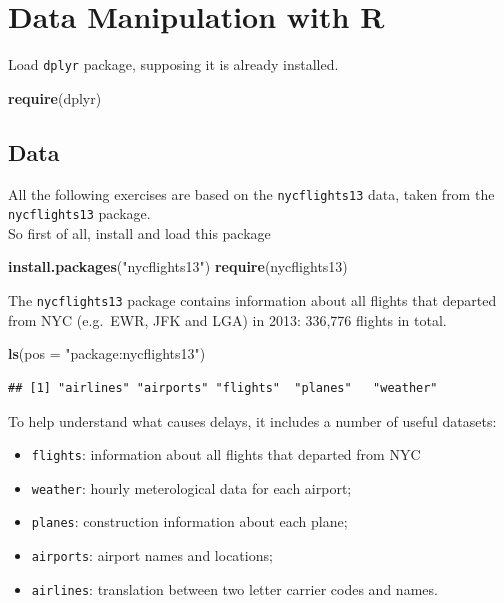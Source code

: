 \documentclass[]{book}
\newenvironment{Shaded}{\begin{snugshade}}{\end{snugshade}}
\newcommand{\KeywordTok}[1]{\textcolor[rgb]{0.13,0.29,0.53}{\textbf{{#1}}}}
\newcommand{\DataTypeTok}[1]{\textcolor[rgb]{0.13,0.29,0.53}{{#1}}}
\newcommand{\StringTok}[1]{\textcolor[rgb]{0.31,0.60,0.02}{{#1}}}
\newcommand{\NormalTok}[1]{{#1}}
\providecommand{\tightlist}{%
  \setlength{\itemsep}{0pt}\setlength{\parskip}{0pt}}
\def\tightlist{}
\begin{document}
\chapter{Data Manipulation with R}\label{data-manipulation-with-r}

Load \texttt{dplyr} package, supposing it is already installed.

\begin{Shaded}
\begin{Highlighting}[]
\KeywordTok{require}\NormalTok{(dplyr)}
\end{Highlighting}
\end{Shaded}

\section{Data}\label{data}

All the following exercises are based on the \texttt{nycflights13} data,
taken from the \texttt{nycflights13} package.\\
So first of all, install and load this package

\begin{Shaded}
\begin{Highlighting}[]
\KeywordTok{install.packages}\NormalTok{(}\StringTok{"nycflights13"}\NormalTok{)}
\KeywordTok{require}\NormalTok{(nycflights13)}
\end{Highlighting}
\end{Shaded}

The \texttt{nycflights13} package contains information about all flights
that departed from NYC (e.g.~EWR, JFK and LGA) in 2013: 336,776 flights
in total.

\begin{Shaded}
\begin{Highlighting}[]
\KeywordTok{ls}\NormalTok{(}\DataTypeTok{pos =} \StringTok{"package:nycflights13"}\NormalTok{)}
\end{Highlighting}
\end{Shaded}

\begin{verbatim}
## [1] "airlines" "airports" "flights"  "planes"   "weather"
\end{verbatim}

To help understand what causes delays, it includes a number of useful
datasets:

\begin{itemize}
\tightlist
\item
  \texttt{flights}: information about all flights that departed from NYC
\item
  \texttt{weather}: hourly meterological data for each airport;
\item
  \texttt{planes}: construction information about each plane;
\item
  \texttt{airports}: airport names and locations;
\item
  \texttt{airlines}: translation between two letter carrier codes and
  names.
\end{itemize}
\end{document}
